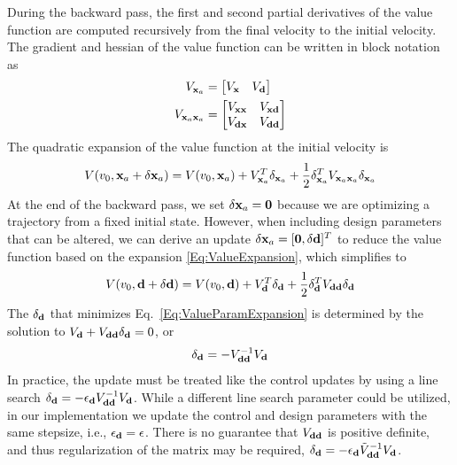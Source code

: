 During the backward pass, the first and second partial derivatives of the value function are computed recursively from the final velocity to the initial velocity. The gradient and hessian of the value function can be written in block notation as 
\begin{align}
	V_{\mathbf{x}_a} &= \begin{bmatrix}
		V_{\mathbf{x}} & V_{\mathbf{d}}
	\end{bmatrix} \\
	V_{\mathbf{x}_a\mathbf{x}_a} &= \begin{bmatrix}
		V_{\mathbf{x}\mathbf{x}} & V_{\mathbf{x}\mathbf{d}} \\
		V_{\mathbf{d}\mathbf{x}} & V_{\mathbf{d}\mathbf{d}}
	\end{bmatrix}
\end{align}
The quadratic expansion of the value function at the initial velocity is
\begin{align}
	V(v_0, \mathbf{x}_a+\delta\mathbf{x}_a) = V(v_0, \mathbf{x}_a) + V_{\mathbf{x}_a}^T\delta_{\mathbf{x}_a} + \frac{1}{2}\delta_{\mathbf{x}_a}^TV_{\mathbf{x}_a\mathbf{x}_a}\delta_{\mathbf{x}_a} \label{Eq:ValueExpansion}
\end{align}
At the end of the backward pass, we set $\delta\mathbf{x}_a=\mathbf{0}$ because we are optimizing a trajectory from a fixed initial state. However, when including design parameters that can be altered, we can derive an update $\delta\mathbf{x}_a = [\mathbf{0},\delta\mathbf{d}]^T$ to reduce the value function based on the expansion \eqref{Eq:ValueExpansion}, which simplifies to 
\begin{align}
	V(v_0, \mathbf{d}+\delta\mathbf{d}) = V(v_0, \mathbf{d}) + V_{\mathbf{d}}^T\delta_{\mathbf{d}} + \frac{1}{2}\delta_{\mathbf{d}}^TV_{\mathbf{d}\mathbf{d}}\delta_{\mathbf{d}} \label{Eq:ValueParamExpansion}
\end{align}
The $\delta_{\mathbf{d}}$ that minimizes Eq.~\eqref{Eq:ValueParamExpansion} is determined by the solution to $V_{\mathbf{d}} + V_{\mathbf{d}\mathbf{d}}\delta_{\mathbf{d}} = 0$, or 
\begin{align}
	\delta_{\mathbf{d}} = -V_{\mathbf{d}\mathbf{d}}^{-1}V_{\mathbf{d}}
\end{align}
In practice, the update must be treated like the control updates by using a line search $\delta_{\mathbf{d}} = -\epsilon_{\mathbf{d}} V_{\mathbf{d}\mathbf{d}}^{-1}V_{\mathbf{d}}$. While a different line search parameter could be utilized, in our implementation we update the control and design parameters with the same stepsize, i.e., $\epsilon_{\mathbf{d}}=\epsilon$. There is no guarantee that $V_{\mathbf{d}\mathbf{d}}$ is positive definite, and thus regularization of the matrix may be required, $\delta_{\mathbf{d}} = -\epsilon_{\mathbf{d}} \tilde{V}_{\mathbf{d}\mathbf{d}}^{-1}V_{\mathbf{d}}$. 

